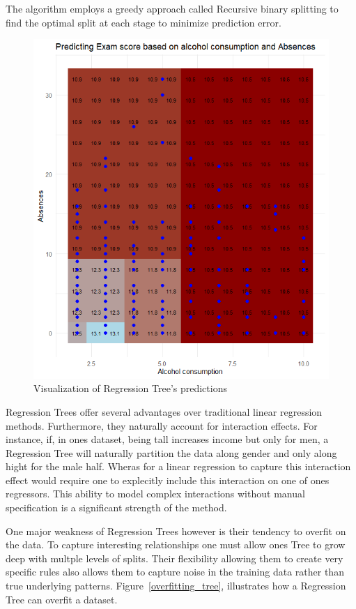 \documentclass[12pt]{article}
\begin{document}
The algorithm employs a greedy approach called Recursive binary splitting to find the optimal split at each stage to minimize prediction error.

\begin{figure}\centering
    \includegraphics[scale=0.40]{red_visual.png}
    \caption{Visualization of Regression Tree's predictions}
    \label{red_visual}
\end{figure}

Regression Trees offer several advantages over traditional linear regression methods.  Furthermore, they naturally account for interaction effects. For instance, if, in ones dataset, being tall increases income but only for men, a Regression Tree will naturally partition the data along gender and only along hight for the male half. Wheras for a linear regression to capture this interaction effect would require one to explecitly include this interaction on one of ones regressors. This ability to model complex interactions without manual specification is a significant strength of the method.

One major weakness of Regression Trees however is their tendency to overfit on the data. To capture interesting relationships one must allow ones Tree to grow deep with multple levels of splits. Their flexibility allowing them to create very specific rules also allows them to capture noise in the training data rather than true underlying patterns. Figure~\ref{overfitting_tree}, illustrates how a Regression Tree can overfit a dataset.
\end{document}
